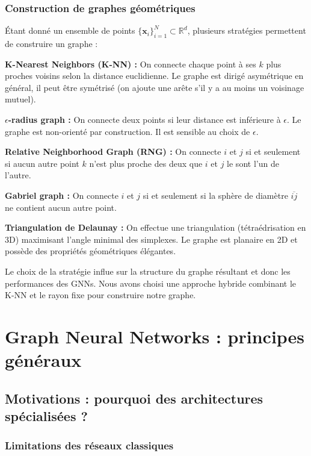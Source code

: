 \subsubsection{Construction de graphes géométriques}

Étant donné un ensemble de points $\{\mathbf{x}_i\}_{i=1}^N \subset \mathbb{R}^d$, plusieurs stratégies permettent de construire un graphe :

\textbf{K-Nearest Neighbors (K-NN) :}
On connecte chaque point à ses $k$ plus proches voisins selon la distance euclidienne. Le graphe est dirigé asymétrique en général, il peut être symétrisé (on ajoute une arête s'il y a au moins un voisinage mutuel).

\textbf{$\epsilon$-radius graph :}
On connecte deux points si leur distance est inférieure à $\epsilon$. Le graphe est non-orienté par construction. Il est sensible au choix de $\epsilon$.

\textbf{Relative Neighborhood Graph (RNG) :}
On connecte $i$ et $j$ si et seulement si aucun autre point $k$ n'est plus proche des deux que $i$ et $j$ le sont l'un de l'autre.

\textbf{Gabriel graph :}
On connecte $i$ et $j$ si et seulement si la sphère de diamètre $\overline{ij}$ ne contient aucun autre point.

\textbf{Triangulation de Delaunay :}
On effectue une triangulation (tétraédrisation en 3D) maximisant l'angle minimal des simplexes. Le graphe est planaire en 2D et possède des propriétés géométriques élégantes.

Le choix de la stratégie influe sur la structure du graphe résultant et donc les performances des GNNs. Nous avons choisi une approche hybride combinant le K-NN et le rayon fixe pour construire notre graphe.

\section{Graph Neural Networks : principes généraux}

\subsection{Motivations : pourquoi des architectures spécialisées ?}

\subsubsection{Limitations des réseaux classiques}

